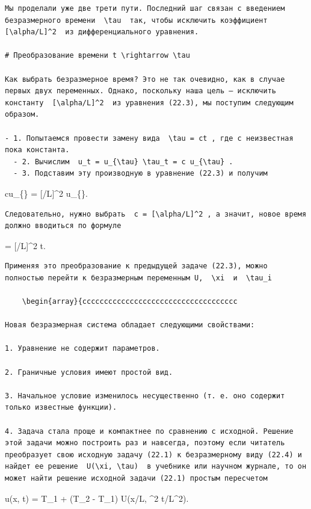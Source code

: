 \documentclass[
  ukrainian,
]{article}
\begin{document}
\begin{verbatim}
Мы проделали уже две трети пути. Последний шаг связан с введением безразмерного времени  \tau  так, чтобы исключить коэффициент  [\alpha/L]^2  из дифференциального уравнения.

# Преобразование времени t \rightarrow \tau

Как выбрать безразмерное время? Это не так очевидно, как в случае первых двух переменных. Однако, поскольку наша цель — исключить константу  [\alpha/L]^2  из уравнения (22.3), мы поступим следующим образом.

- 1. Попытаемся провести замену вида  \tau = ct , где c неизвестная пока константа.
  - 2. Вычислим  u_t = u_{\tau} \tau_t = c u_{\tau} .
  - 3. Подставим эту производную в уравнение (22.3) и получим
\end{verbatim}

cu\_\{\} = {[}\alpha/L{]}\^{}2 u\_\{\xi\xi\}.

\begin{verbatim}
Следовательно, нужно выбрать  c = [\alpha/L]^2 , а значит, новое время должно вводиться по формуле
\end{verbatim}

\tau = {[}\alpha/L{]}\^{}2 t.

\begin{verbatim}
Применяя это преобразование к предыдущей задаче (22.3), можно полностью перейти к безразмерным переменным U,  \xi  и  \tau_i 

    \begin{array}{cccccccccccccccccccccccccccccccccccc

Новая безразмерная система обладает следующими свойствами:

1. Уравнение не содержит параметров.

2. Граничные условия имеют простой вид.

3. Начальное условие изменилось несущественно (т. е. оно содержит только известные функции).

4. Задача стала проще и компактнее по сравнению с исходной. Решение этой задачи можно построить раз и навсегда, поэтому если читатель преобразует свою исходную задачу (22.1) к безразмерному виду (22.4) и найдет ее решение  U(\xi, \tau)  в учебнике или научном журнале, то он может найти решение исходной задачи (22.1) простым пересчетом
\end{verbatim}

u(x, t) = T\_1 + (T\_2 - T\_1) U(x/L, \alpha\^{}2 t/L\^{}2).
\end{document}
